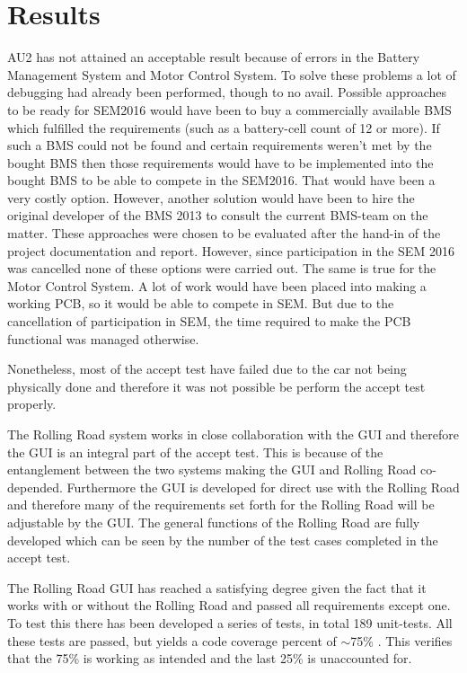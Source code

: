 \chapter{Results}
AU2 has not attained an acceptable result because of errors in the Battery Management System and Motor Control System. To solve these problems a lot of debugging had already been performed, though to no avail. Possible approaches to be ready for SEM2016 would have been to buy a commercially available BMS which fulfilled the requirements (such as a battery-cell count of 12 or more). If such a BMS could not be found and certain requirements weren't met by the bought BMS then those requirements would have to be implemented into the bought BMS to be able to compete in the SEM2016. That would have been a very costly option. However, another solution would have been to hire the original developer of the BMS 2013 to consult the current BMS-team on the matter. These approaches were chosen to be evaluated after the hand-in of the project documentation and report. However, since participation in the SEM 2016 was cancelled none of these options were carried out.
The same is true for the Motor Control System. A lot of work would have been placed into making a working PCB, so it would be able to compete in SEM. But due to the cancellation of participation in SEM, the time required to make the PCB functional was managed otherwise.

Nonetheless, most of the accept test have failed due to the car not being physically done and therefore it was not possible be perform the accept test properly.

The Rolling Road system works in close collaboration with the GUI and therefore the GUI is an integral part of the accept test. This is because of the entanglement between the two systems making the GUI and Rolling Road co-depended. Furthermore the GUI is developed for direct use with the Rolling Road and therefore many of the requirements set forth for the Rolling Road will be adjustable by the GUI. The general functions of the Rolling Road are fully developed which can be seen by the number of the test cases completed in the accept test.

The Rolling Road GUI has reached a satisfying degree given the fact that it works with or without the Rolling Road and passed all requirements except one. To test this there has been developed a series of tests, in total 189 unit-tests. All these tests are passed, but yields a code coverage percent of $\sim$75\% . This verifies that the 75\% is working as intended and the last 25\% is unaccounted for.

